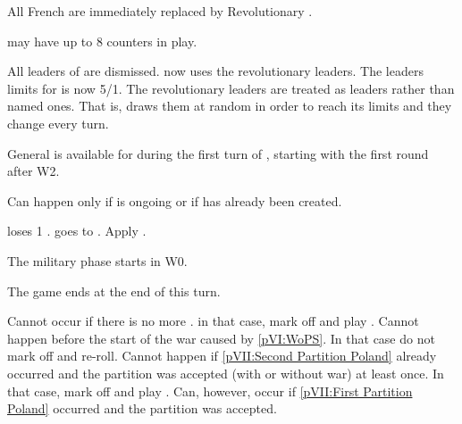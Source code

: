 \begin{digressions}
  \phdipl
  \aparag All French \ARMY are immediately replaced by Revolutionary \ARMY.

  \aparag \FRA may have up to 8 \ARMY counters in play.

  \bparag All leaders of \FRA are dismissed. \FRA now uses the revolutionary
  leaders.
  \bparag The leaders limits for \FRA is now 5\LeaderG/1\LeaderA.
  \bparag The revolutionary leaders are treated as \anonyme leaders rather
  than named ones. That is, \FRA draws them at random in order to reach
  its limits and they change every turn.

  \aparag General  is available for \FRA during the
  first turn of \monarqueTerror, starting with the first round after
  W2. %
\end{digressions}



\condition{}
\aparag Can happen only if  is ongoing or if
\paysusa has already been created.

\phevnt
\aparag \FRA loses 1 \STAB.
\aparag \FRA goes to \monarqueTerror. Apply
.

\phmil
\aparag The military phase starts in W0.

\phpaix
\aparag The game ends at the end of this turn.





\condition{}
\aparag Cannot occur if there is no more \payspologne. in that case, mark off
and play \RD.
\aparag Cannot happen before the start of the war caused by \ref{pVI:WoPS}. In
that case do not mark off and re-roll.
\aparag Cannot happen if \ref{pVII:Second Partition Poland} already occurred
and the partition was accepted (with or without war) at least once. In that
case, mark off and play \RD.
\bparag Can, however, occur if \ref{pVII:First Partition Poland} occurred and
the partition was accepted.

